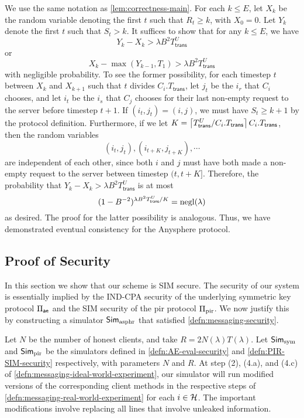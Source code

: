  We use the same notation as \cref{lem:correctness-main}. For each $k \leq E$, let $X_k$ be the random variable denoting the first $t$ such that $R_t \geq k$, with $X_0 = 0$. Let $Y_k$ denote the first $t$ such that $S_{t} > k$. It suffices to show that for any $k \leq E$, we have
 $$Y_k - X_k > \lambda B^2 T^U_{\mathsf{trans}}$$
 or
 $$X_{k} - \max(Y_{k - 1}, T_1) > \lambda B^2 T^U_{\mathsf{trans}}$$
 with negligible probability. To see the former possibility, for each timestep $t$ between $X_k$ and $X_{k + 1}$ such that $t$ divides $C_i.T_{\mathsf{trans}}$, let $j_t$ be the $i_r$ that $C_i$ chooses, and let $i_t$ be the $i_s$ that $C_j$ chooses for their last non-empty request to the server before timestep $t + 1$. If $(i_t, j_t) = (i, j)$, we must have $S_{t} \geq k + 1$ by the protocol definition. Furthermore, if we let $K = \left\lceil T^U_{\mathsf{trans}} / C_i.T_{\mathsf{trans}} \right\rceil C_i.T_{\mathsf{trans}}$, then the random variables
 $$(i_t, j_t), (i_{t + K}, j_{t + K}), \cdots$$
are independent of each other, since both $i$ and $j$ must have both made a non-empty request to the server between timestep $(t, t + K]$. Therefore, the probability that $Y_k - X_k > \lambda B^2 T^U_{\mathsf{trans}}$ is at most
$$(1 - B^{-2})^{\lambda B^2 T^U_{\mathsf{trans}} / K} = \operatorname{negl}(\lambda)$$
as desired. The proof for the latter possibility is analogous. Thus, we have demonstrated eventual consistency for the Anysphere protocol.
\subsection{Proof of Security}
In this section we show that our scheme is SIM secure. The security of our system is essentially implied by the IND-CPA security of the underlying symmetric key protocol $\Pi_{\mathsf{ae}}$ and the SIM security of the pir protocol $\Pi_{\text{pir}}$. We now justify this by constructing a simulator $\mathsf{Sim}_{\text{asphr}}$ that satisfied \cref{defn:messaging-security}.

Let $N$ be the number of honest clients, and take $R = 2N(\lambda)T(\lambda)$. Let $\mathsf{Sim}_{\text{sym}}$ and $\mathsf{Sim}_{\text{pir}}$ be the simulators defined in \cref{defn:AE-eval-security} and \cref{defn:PIR-SIM-security} respectively, with parameters $N$ and $R$. At step (2), (4.a), and (4.c) of \cref{defn:messaging-ideal-world-experiment}, our simulator will run modified versions of the corresponding client methods in the respective steps of \cref{defn:messaging-real-world-experiment} for each $i \in \mathcal{H}$. The important modifications involve replacing all lines that involve unleaked information.

